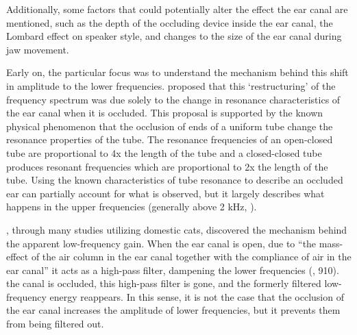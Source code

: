 \DIFdelbegin {}\DIFdelend Additionally, some factors that could potentially alter the effect \DIFdelbegin {}\DIFdelend \DIFaddbegin {}\DIFaddend the ear canal are mentioned, such as the depth of the occluding device inside the ear canal, the Lombard effect on speaker style, and changes to the size of the ear canal during jaw movement.

\DIFaddbegin {}

\DIFaddend Early on, the particular focus was to understand the mechanism behind this shift in amplitude to the lower frequencies. \cite{huizing:60} proposed that this `restructuring' of the frequency spectrum was due solely to the change in resonance characteristics of the ear canal when it is occluded.  This proposal is supported by the known physical phenomenon that the occlusion \DIFdelbegin {}\DIFdelend of ends of a uniform tube change the resonance properties of the tube. The resonance frequencies of an open-closed tube are proportional to 4x the length of the tube and a closed-closed tube produces resonant frequencies which are proportional to 2x the length of the tube.  Using the known characteristics of tube resonance to describe an occluded ear can partially account for what is observed, but it largely describes what happens in the upper frequencies (generally above 2 kHz, \cite{stenfelt:03}).  

\cite{tonndorf:66}, through many studies utilizing domestic cats,  discovered the mechanism behind the apparent low-frequency gain.  When the ear canal is open, due to ``the mass-effect of the air column in the ear canal together with the compliance of air in the ear canal'' it acts as a high-pass filter, dampening the lower frequencies (\cite{stenfelt:03}, 910).  \DIFdelbegin {}\DIFdelend \DIFaddbegin {}\DIFaddend the canal is occluded, this high-pass filter is gone, and the formerly filtered low-frequency energy reappears.  In this sense, it is not the case that the occlusion of the ear canal increases the amplitude of lower frequencies, but it prevents them from being filtered out.

